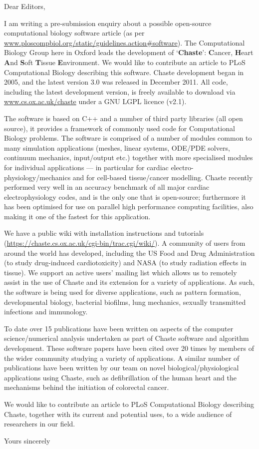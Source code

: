 \documentclass{oxcsletter}
\begin{document}
\begin{letter}{}

\subject{Pre-submission enquiry to PLoS Computational Biology}  

\opening{Dear Editors,}

I am writing a pre-submission enquiry about a possible open-source computational biology software article (as per \url{www.ploscompbiol.org/static/guidelines.action#software}).
The Computational Biology Group here in Oxford leads the development of `\textbf{Chaste}': \textbf{C}ancer, \textbf{H}eart \textbf{A}nd \textbf{S}oft \textbf{T}issue \textbf{E}nvironment. 
We would like to contribute an article to PLoS Computational Biology describing this software. 
Chaste development began in 2005, and the latest version 3.0 was released in December 2011.
All code, including the latest development version, is freely available to download via \url{www.cs.ox.ac.uk/chaste} under a GNU LGPL licence (v2.1).

The software is based on C++ and a number of third party libraries (all open source), it provides a framework of commonly used code for Computational Biology problems. 
The software is comprised of a number of modules common to many simulation applications (meshes, linear systems, ODE/PDE solvers, continuum mechanics, input/output etc.) together with more specialised modules for individual applications --- in particular for cardiac electro-physiology/mechanics and for cell-based tissue/cancer modelling. 
Chaste recently performed very well in an accuracy benchmark of all major cardiac electrophysiology codes, and is the only one that is open-source; 
furthermore it has been optimised for use on parallel high performance computing facilities, also making it one of the fastest for this application.

We have a public wiki with installation instructions and tutorials (\url{https://chaste.cs.ox.ac.uk/cgi-bin/trac.cgi/wiki/}). 
A community of users from around the world has developed, including the US Food and Drug Administration (to study drug-induced cardiotoxicity) and NASA (to study radiation effects in tissue). 
We support an active users' mailing list which allows us to remotely assist in the use of Chaste and its extension for a variety of applications. 
As such, the software is being used for diverse applications, such as pattern formation, developmental biology, bacterial biofilms, lung mechanics, sexually transmitted infections and immunology. 

To date over 15 publications have been written on aspects of the computer science/numerical analysis undertaken as part of Chaste software and algorithm development. 
These software papers have been cited over 20 times by members of the wider community studying a variety of applications.
A similar number of publications have been written by our team on novel biological/physiological applications using Chaste, such as defibrillation of the human heart and the mechanisms behind the initiation of colorectal cancer.

We would like to contribute an article to PLoS Computational Biology describing Chaste, together with its current and potential uses, to a wide audience of researchers in our field.

\closing{Yours sincerely}
\end{letter}
\end{document}

